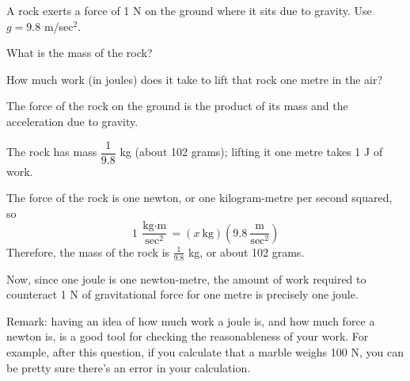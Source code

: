 \begin{Mquestion}
A rock exerts a force of 1 N on the ground where it sits due to  gravity. Use $g=9.8$ m/sec$^2$.

What is the mass of the rock?

How much work (in joules) does it take to lift that rock one metre in the air?
\end{Mquestion}
\begin{hint}
The force of the rock on the ground is the product of its mass and the acceleration due to gravity.
\end{hint}
\begin{answer}
The rock has mass $\dfrac{1}{9.8}$ kg (about 102 grams); lifting it one metre takes 1 J of work.
\end{answer}
\begin{solution}
The force of the rock is one newton, or one kilogram-metre per second squared, so
\[1~\frac{\text{kg}\cdot\text{m}}{\text{sec}^2} = (x~\text{kg})\left(9.8~\frac{\text{m}}{\text{sec}^2}\right)\]
Therefore, the mass of the rock is $\frac{1}{9.8} $ kg, or about 102 grams.

Now, since one joule is one newton-metre, the amount of work required to counteract 1 N of gravitational force for one metre is precisely one joule.

Remark:  having an idea of how much work a joule is, and how much force a newton is, is a good tool for checking the reasonableness of your work. For example, after this question, if you calculate that a marble weighs 100 N, you can be pretty sure there's an error in your calculation.
\end{solution}



